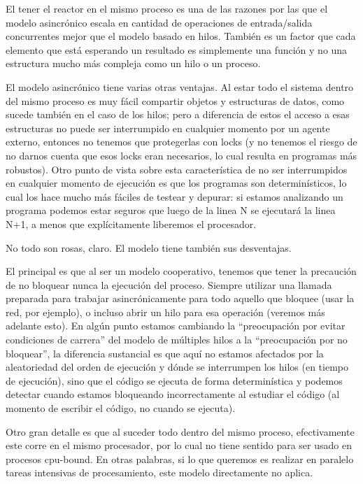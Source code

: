 El tener el reactor en el mismo proceso es una de las razones por las que el modelo asincrónico escala en cantidad de operaciones de entrada/salida concurrentes mejor que el modelo basado en hilos. También es un factor que cada elemento que está esperando un resultado es simplemente una función y no una estructura mucho más compleja como un hilo o un proceso.

El modelo asincrónico tiene varias otras ventajas. Al estar todo el sistema dentro del mismo proceso es muy fácil compartir objetos y estructuras de datos, como sucede también en el caso de los hilos; pero a diferencia de estos el acceso a esas estructuras no puede ser interrumpido en cualquier momento por un agente externo, entonces no tenemos que protegerlas con locks (y no tenemos el riesgo de no darnos cuenta que esos locks eran necesarios, lo cual resulta en programas más robustos). Otro punto de vista sobre esta característica de no ser interrumpidos en cualquier momento de ejecución es que los programas son determinísticos, lo cual los hace mucho más fáciles de testear y depurar: si estamos analizando un programa podemos estar seguros que luego de la linea N se ejecutará la linea N+1, a menos que explícitamente liberemos el procesador.

No todo son rosas, claro. El modelo tiene también sus desventajas.

El principal es que al ser un modelo cooperativo, tenemos que tener la precaución de no bloquear nunca la ejecución del proceso. Siempre utilizar una llamada preparada para trabajar asincrónicamente para todo aquello que bloquee (usar la red, por ejemplo), o incluso abrir un hilo para esa operación (veremos más adelante esto). En algún punto estamos cambiando la ``preocupación por evitar condiciones de carrera'' del modelo de múltiples hilos a la ``preocupación por no bloquear'', la diferencia sustancial es que aquí no estamos afectados por la aleatoriedad del orden de ejecución y dónde se interrumpen los hilos (en tiempo de ejecución), sino que el código se ejecuta de forma determinística y podemos detectar cuando estamos bloqueando incorrectamente al estudiar el código (al momento de escribir el código, no cuando se ejecuta).

Otro gran detalle es que al suceder todo dentro del mismo proceso, efectivamente este corre en el mismo procesador, por lo cual no tiene sentido para ser usado en procesos cpu-bound. En otras palabras, si lo que queremos es realizar en paralelo tareas intensivas de procesamiento, este modelo directamente no aplica.

